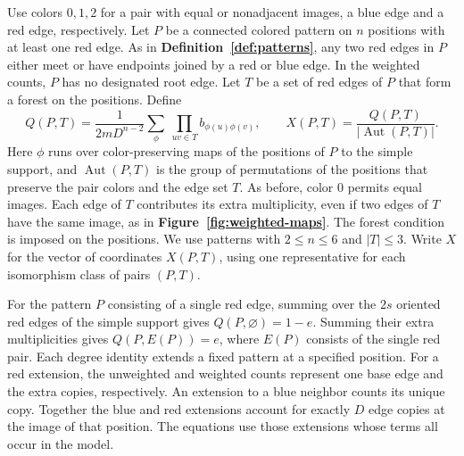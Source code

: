 Use colors $0,1,2$ for a pair with equal or nonadjacent images,
a blue edge and a red edge, respectively. Let $P$ be a connected colored pattern on $n$ positions
with at least one red edge. As in \textbf{Definition~\ref{def:patterns}},
any two red edges in $P$ either meet or have endpoints joined by a red
or blue edge. In the weighted counts, $P$ has no designated root edge.
Let $T$ be a set of red edges of $P$ that form a forest on the positions.
Define
\[
 Q(P,T)=\frac{1}{2mD^{n-2}}
       \sum_{\phi}\ \prod_{uv\in T} b_{\phi(u)\phi(v)},
 \qquad
 X(P,T)=\frac{Q(P,T)}{|\operatorname{Aut}(P,T)|}.
\]
Here $\phi$ runs over color-preserving maps of the positions of $P$
to the simple support, and $\operatorname{Aut}(P,T)$ is the group of
permutations of the positions that preserve the pair colors and the
edge set $T$. As before, color $0$ permits equal images. Each edge
of $T$ contributes its extra multiplicity, even if two edges of $T$
have the same image, as in \textbf{Figure~\ref{fig:weighted-maps}}.
The forest condition is imposed on the positions. We use patterns
with $2\le n\le6$ and $|T|\le3$. Write $X$ for the vector of coordinates
$X(P,T)$, using one representative for each isomorphism class of pairs
$(P,T)$.



For the pattern $P$ consisting of a single red edge, summing over the
$2s$ oriented red edges of the simple support gives $Q(P,\varnothing)=1-e$. Summing their extra
multiplicities gives $Q(P,E(P))=e$, where $E(P)$ consists of the
single red pair. Each degree identity extends a fixed pattern
at a specified position. For a red extension, the unweighted and
weighted counts represent one base edge and the extra copies,
respectively. An extension to a blue neighbor counts its unique copy.
Together the blue and red extensions account for exactly
$D$ edge copies at the image of that position. The equations use
those extensions whose terms all occur in the model.

